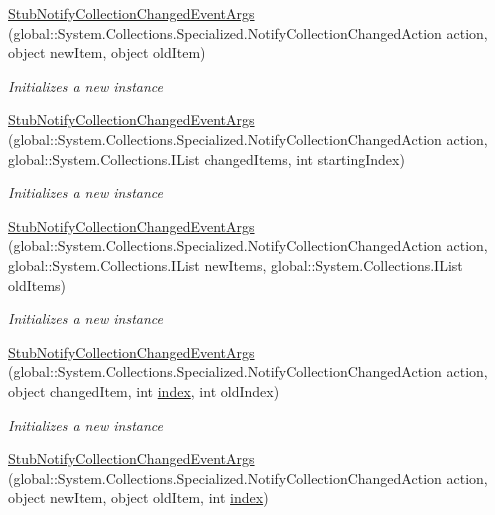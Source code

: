 \begin{DoxyCompactItemize}
\hyperlink{class_system_1_1_collections_1_1_specialized_1_1_fakes_1_1_stub_notify_collection_changed_event_args_aea41ca785d0c904b502d47315a7e559f}{Stub\-Notify\-Collection\-Changed\-Event\-Args} (global\-::\-System.\-Collections.\-Specialized.\-Notify\-Collection\-Changed\-Action action, object new\-Item, object old\-Item)
\begin{DoxyCompactList}\small\item\em Initializes a new instance\end{DoxyCompactList}\item 
\hyperlink{class_system_1_1_collections_1_1_specialized_1_1_fakes_1_1_stub_notify_collection_changed_event_args_ab66fbef10562579402b69dbafaaa517b}{Stub\-Notify\-Collection\-Changed\-Event\-Args} (global\-::\-System.\-Collections.\-Specialized.\-Notify\-Collection\-Changed\-Action action, global\-::\-System.\-Collections.\-I\-List changed\-Items, int starting\-Index)
\begin{DoxyCompactList}\small\item\em Initializes a new instance\end{DoxyCompactList}\item 
\hyperlink{class_system_1_1_collections_1_1_specialized_1_1_fakes_1_1_stub_notify_collection_changed_event_args_ac166705f1425b9c02617657781e4d21f}{Stub\-Notify\-Collection\-Changed\-Event\-Args} (global\-::\-System.\-Collections.\-Specialized.\-Notify\-Collection\-Changed\-Action action, global\-::\-System.\-Collections.\-I\-List new\-Items, global\-::\-System.\-Collections.\-I\-List old\-Items)
\begin{DoxyCompactList}\small\item\em Initializes a new instance\end{DoxyCompactList}\item 
\hyperlink{class_system_1_1_collections_1_1_specialized_1_1_fakes_1_1_stub_notify_collection_changed_event_args_a119820085890c0a6c6755029be3a59b8}{Stub\-Notify\-Collection\-Changed\-Event\-Args} (global\-::\-System.\-Collections.\-Specialized.\-Notify\-Collection\-Changed\-Action action, object changed\-Item, int \hyperlink{jquery-1_810_82-vsdoc_8js_a75bb12d1f23302a9eea93a6d89d0193e}{index}, int old\-Index)
\begin{DoxyCompactList}\small\item\em Initializes a new instance\end{DoxyCompactList}\item 
\hyperlink{class_system_1_1_collections_1_1_specialized_1_1_fakes_1_1_stub_notify_collection_changed_event_args_ae1a59d33e63a03b7ea5ea8058b97a7a5}{Stub\-Notify\-Collection\-Changed\-Event\-Args} (global\-::\-System.\-Collections.\-Specialized.\-Notify\-Collection\-Changed\-Action action, object new\-Item, object old\-Item, int \hyperlink{jquery-1_810_82-vsdoc_8js_a75bb12d1f23302a9eea93a6d89d0193e}{index})

\end{DoxyCompactItemize}
